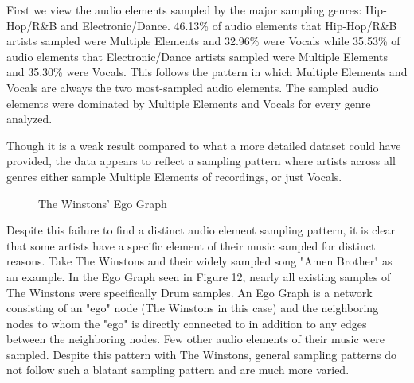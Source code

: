 \documentclass[pageno]{jpaper}
\begin{document}
First we view the audio elements sampled by the major sampling genres: Hip-Hop/R\&B and Electronic/Dance. 46.13\% of audio elements that Hip-Hop/R\&B artists sampled were Multiple Elements and 32.96\% were Vocals while 35.53\% of audio elements that Electronic/Dance artists sampled were Multiple Elements and 35.30\% were Vocals. This follows the pattern in which Multiple Elements and Vocals are always the two most-sampled audio elements. The sampled audio elements were dominated by Multiple Elements and Vocals for every genre analyzed.

Though it is a weak result compared to what a more detailed dataset could have provided, the data appears to reflect a sampling pattern where artists across all genres either sample Multiple Elements of recordings, or just Vocals.
\begin{figure}[H]
\caption{The Winstons' Ego Graph}
\label{fig:fig12}
\centering
\end{figure}
Despite this failure to find a distinct audio element sampling pattern, it is clear that some artists have a specific element of their music sampled for distinct reasons. Take The Winstons and their widely sampled song "Amen Brother" as an example. In the Ego Graph seen in Figure 12, nearly all existing samples of The Winstons were specifically Drum samples. An Ego Graph is a network consisting of an "ego" node (The Winstons in this case) and the neighboring nodes to whom the "ego" is directly connected to in addition to any edges between the neighboring nodes. Few other audio elements of their music were sampled. Despite this pattern with The Winstons, general sampling patterns do not follow such a blatant sampling pattern and are much more varied.
\end{document}
